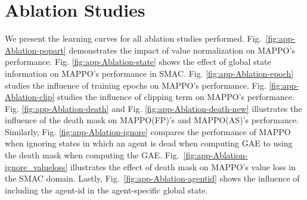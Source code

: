 \section{Ablation Studies}
\label{app:ablation-studies}





We present the learning curves for all ablation studies performed. Fig.~\ref{fig:app-Ablation-popart} demonstrates the impact of value normalization on MAPPO's performance. Fig. \ref{fig:app-Ablation-state} shows the effect of global state information on MAPPO's performance in SMAC. Fig. \ref{fig:app-Ablation-epoch} studies the influence of training epochs on MAPPO's performance. Fig. \ref{fig:app-Ablation-clip} studies the influence of clipping term on MAPPO's performance.
Fig. \ref{fig:app-Ablation-death} and Fig. \ref{fig:app-Ablation-death-new} illustrates the influence of the death mask on MAPPO(FP)'s and MAPPO(AS)'s performance. Similarly, Fig. \ref{fig:app-Ablation-ignore} compares the performance of MAPPO when ignoring states in which an agent is dead when computing GAE to using the death mask when computing the GAE. Fig.~\ref{fig:app-Ablation-ignore_valueloss} illustrates the effect of death mask on MAPPO's value loss in the SMAC domain. Lastly, Fig.~\ref{fig:app-Ablation-agentid} shows the influence of including the agent-id in the agent-specific global state. 



